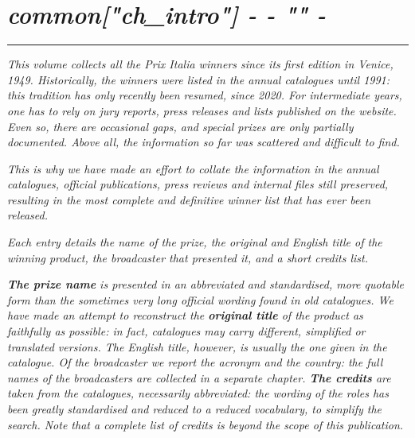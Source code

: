 {%

{%
\chapter*{\hfill{\slshape {{ common["ch_intro"] -}} {{- "}}" -}}
\thispagestyle{empty}
\vspace{70pt}
\lipsum[1-5]
\par\vspace{20pt}
\par\noindent\rule{\textwidth}{0.2pt}
\par\vspace{30pt}
\textsl{This volume collects all the Prix Italia winners since its first edition in Venice, 1949. Historically, the winners were listed in the annual catalogues until 1991: this tradition has only recently been resumed, since 2020. For intermediate years, one has to rely on jury reports, press releases and lists published on the website. Even so, there are occasional gaps, and special prizes are only partially documented. Above all, the information so far was scattered and difficult to find.}

\textsl{This is why we have made an effort to collate the information in the annual catalogues, official publications, press reviews and internal files still preserved, resulting in the most complete and definitive winner list that has ever been released.}

\textsl{Each entry details the name of the prize, the original and English title of the winning product, the broadcaster that presented it, and a short credits list.}

\textsl{\textbf{The prize name} is presented in an abbreviated and standardised, more quotable form than the sometimes very long official wording found in old catalogues. We have made an attempt to reconstruct the \textbf{original title} of the product as faithfully as possible: in fact, catalogues may carry different, simplified or translated versions. The English title, however, is usually the one given in the catalogue. Of the broadcaster we report the acronym and the country: the full names of the broadcasters are collected in a separate chapter. \textbf{The credits} are taken from the catalogues, necessarily abbreviated: the wording of the roles has been greatly standardised and reduced to a reduced vocabulary, to simplify the search. Note that a complete list of credits is beyond the scope of this publication.}

}}

